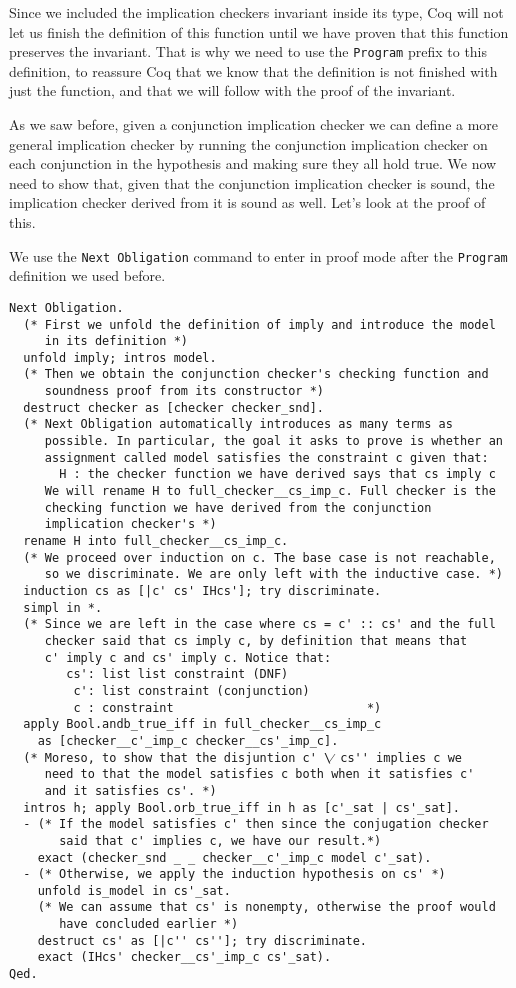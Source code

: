 Since we included the implication checkers invariant inside its type, Coq will not let us finish the definition
of this function until we have proven that this function preserves the invariant. That is why we need to use
the \texttt{Program} prefix to this definition, to reassure Coq that we know that the definition is not finished 
with just the function, and that we will follow with the proof of the invariant.

As we saw before, given a conjunction implication checker we can define a more general implication checker
by running the conjunction implication checker on each conjunction in the hypothesis and making sure they 
all hold true. We now need to show that, given that the conjunction implication checker is sound, the
implication checker derived from it is sound as well. Let's look at the proof of this.

We use the \texttt{Next Obligation} command to enter in proof mode after the \texttt{Program} definition we used before.

\begin{verbatim}
Next Obligation.
  (* First we unfold the definition of imply and introduce the model
     in its definition *)
  unfold imply; intros model.
  (* Then we obtain the conjunction checker's checking function and 
     soundness proof from its constructor *)
  destruct checker as [checker checker_snd].
  (* Next Obligation automatically introduces as many terms as 
     possible. In particular, the goal it asks to prove is whether an 
     assignment called model satisfies the constraint c given that:
       H : the checker function we have derived says that cs imply c
     We will rename H to full_checker__cs_imp_c. Full checker is the
     checking function we have derived from the conjunction 
     implication checker's *)
  rename H into full_checker__cs_imp_c.
  (* We proceed over induction on c. The base case is not reachable,
     so we discriminate. We are only left with the inductive case. *)
  induction cs as [|c' cs' IHcs']; try discriminate.
  simpl in *.
  (* Since we are left in the case where cs = c' :: cs' and the full
     checker said that cs imply c, by definition that means that
     c' imply c and cs' imply c. Notice that:
        cs': list list constraint (DNF)
         c': list constraint (conjunction)
         c : constraint                           *)
  apply Bool.andb_true_iff in full_checker__cs_imp_c 
    as [checker__c'_imp_c checker__cs'_imp_c].
  (* Moreso, to show that the disjuntion c' \⁄ cs'' implies c we
     need to that the model satisfies c both when it satisfies c' 
     and it satisfies cs'. *)
  intros h; apply Bool.orb_true_iff in h as [c'_sat | cs'_sat].
  - (* If the model satisfies c' then since the conjugation checker
       said that c' implies c, we have our result.*)
    exact (checker_snd _ _ checker__c'_imp_c model c'_sat).
  - (* Otherwise, we apply the induction hypothesis on cs' *)
    unfold is_model in cs'_sat.
    (* We can assume that cs' is nonempty, otherwise the proof would
       have concluded earlier *)
    destruct cs' as [|c'' cs'']; try discriminate.
    exact (IHcs' checker__cs'_imp_c cs'_sat).
Qed.
\end{verbatim}

